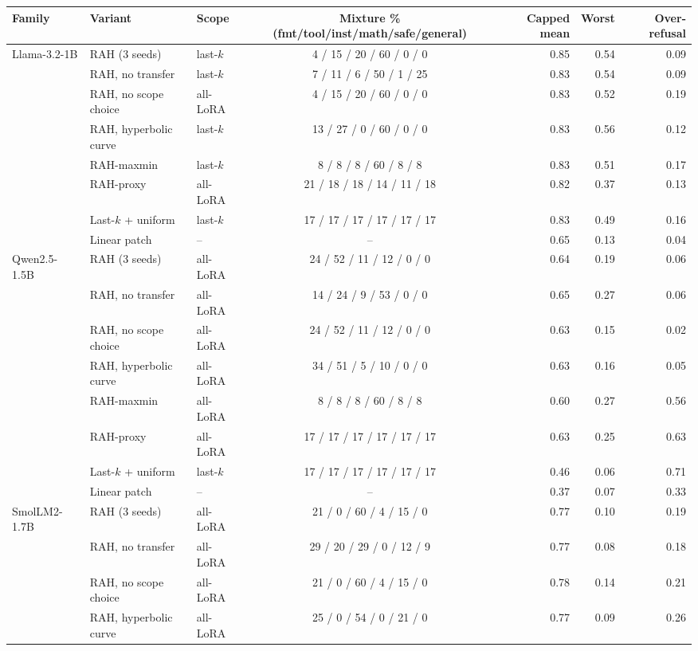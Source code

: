 \begin{tabular}{lllcrrr}
\toprule
Family & Variant & Scope & Mixture \% (fmt/tool/inst/math/safe/general) & Capped mean & Worst & Over-refusal \\
\midrule
Llama-3.2-1B & RAH (3 seeds) & last-$k$ & 4 / 15 / 20 / 60 / 0 / 0 & 0.85 & 0.54 & 0.09 \\
 & RAH, no transfer & last-$k$ & 7 / 11 / 6 / 50 / 1 / 25 & 0.83 & 0.54 & 0.09 \\
 & RAH, no scope choice & all-LoRA & 4 / 15 / 20 / 60 / 0 / 0 & 0.83 & 0.52 & 0.19 \\
 & RAH, hyperbolic curve & last-$k$ & 13 / 27 / 0 / 60 / 0 / 0 & 0.83 & 0.56 & 0.12 \\
 & RAH-maxmin & last-$k$ & 8 / 8 / 8 / 60 / 8 / 8 & 0.83 & 0.51 & 0.17 \\
 & RAH-proxy & all-LoRA & 21 / 18 / 18 / 14 / 11 / 18 & 0.82 & 0.37 & 0.13 \\
 & Last-$k$ + uniform & last-$k$ & 17 / 17 / 17 / 17 / 17 / 17 & 0.83 & 0.49 & 0.16 \\
 & Linear patch & -- & -- & 0.65 & 0.13 & 0.04 \\
\midrule
Qwen2.5-1.5B & RAH (3 seeds) & all-LoRA & 24 / 52 / 11 / 12 / 0 / 0 & 0.64 & 0.19 & 0.06 \\
 & RAH, no transfer & all-LoRA & 14 / 24 / 9 / 53 / 0 / 0 & 0.65 & 0.27 & 0.06 \\
 & RAH, no scope choice & all-LoRA & 24 / 52 / 11 / 12 / 0 / 0 & 0.63 & 0.15 & 0.02 \\
 & RAH, hyperbolic curve & all-LoRA & 34 / 51 / 5 / 10 / 0 / 0 & 0.63 & 0.16 & 0.05 \\
 & RAH-maxmin & all-LoRA & 8 / 8 / 8 / 60 / 8 / 8 & 0.60 & 0.27 & 0.56 \\
 & RAH-proxy & all-LoRA & 17 / 17 / 17 / 17 / 17 / 17 & 0.63 & 0.25 & 0.63 \\
 & Last-$k$ + uniform & last-$k$ & 17 / 17 / 17 / 17 / 17 / 17 & 0.46 & 0.06 & 0.71 \\
 & Linear patch & -- & -- & 0.37 & 0.07 & 0.33 \\
\midrule
SmolLM2-1.7B & RAH (3 seeds) & all-LoRA & 21 / 0 / 60 / 4 / 15 / 0 & 0.77 & 0.10 & 0.19 \\
 & RAH, no transfer & all-LoRA & 29 / 20 / 29 / 0 / 12 / 9 & 0.77 & 0.08 & 0.18 \\
 & RAH, no scope choice & all-LoRA & 21 / 0 / 60 / 4 / 15 / 0 & 0.78 & 0.14 & 0.21 \\
 & RAH, hyperbolic curve & all-LoRA & 25 / 0 / 54 / 0 / 21 / 0 & 0.77 & 0.09 & 0.26 \\

\end{tabular}
